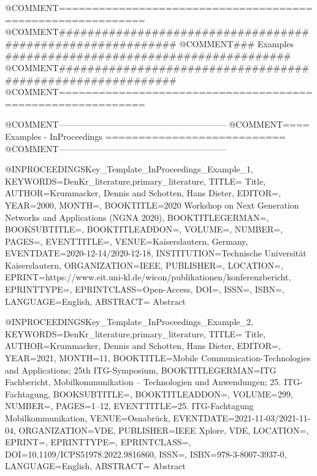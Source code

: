 @COMMENT{===========================================================}
@COMMENT{###########################################################}
@COMMENT{###    Examples    ########################################}
@COMMENT{###########################################################}
@COMMENT{===========================================================}


@COMMENT{-----------------------------------------------------------}
@COMMENT{====  Examples - InProceedings  ===========================}
@COMMENT{-----------------------------------------------------------}

@INPROCEEDINGS{Key_Template_InProceedings_Example_1,
    KEYWORDS={DenKr_literature,primary_literature},
    TITLE={\begingroup
        Title\endgroup},
    AUTHOR={Krummacker, Dennis and Schotten, Hans Dieter},
    EDITOR={},
    YEAR={2000},
    MONTH={},
    BOOKTITLE={2020 Workshop on Next Generation Networks and Applications (NGNA 2020)},
    BOOKTITLEGERMAN={},
    BOOKSUBTITLE={},
    BOOKTITLEADDON={},
    VOLUME={},
    NUMBER={},
    PAGES={},
    EVENTTITLE={},
    VENUE={Kaiserslautern, Germany},
    EVENTDATE={2020-12-14/2020-12-18},
    INSTITUTION={Technische Universit{\"a}t Kaiserslautern},
    ORGANIZATION={IEEE},
    PUBLISHER={},
    LOCATION={},
    EPRINT={https://www.eit.uni-kl.de/wicon/publikationen/konferenzbericht},
    EPRINTTYPE={},
    EPRINTCLASS={Open-Access},
    DOI={},
    ISSN={},
    ISBN={},
    LANGUAGE={English},
    ABSTRACT={\begingroup
        Abstract\endgroup}
}

@INPROCEEDINGS{Key_Template_InProceedings_Example_2,
    KEYWORDS={DenKr_literature,primary_literature},
    TITLE={\begingroup
        Title\endgroup},
    AUTHOR={Krummacker, Dennis and Schotten, Hans Dieter},
    EDITOR={},
    YEAR={2021},
    MONTH={11},
    BOOKTITLE={Mobile Communication-Technologies and Applications; 25th ITG-Symposium},
    BOOKTITLEGERMAN={ITG Fachbericht, Mobilkommunikation -- Technologien und Anwendungen; 25. ITG-Fachtagung},
    BOOKSUBTITLE={},
    BOOKTITLEADDON={},
    VOLUME={299},
    NUMBER={},
    PAGES={1--12},
    EVENTTITLE={25. ITG-Fachtagung Mobilkommunikation},
    VENUE={Osnabr{\"u}ck},
    EVENTDATE={2021-11-03/2021-11-04},
    ORGANIZATION={VDE},
    PUBLISHER={IEEE Xplore, VDE},
    LOCATION={},
    EPRINT={},
    EPRINTTYPE={},
    EPRINTCLASS={},
    DOI={10.1109/ICPS51978.2022.9816860},
    ISSN={},
    ISBN={978-3-8007-3937-0},
    LANGUAGE={English},
    ABSTRACT={\begingroup
        Abstract\endgroup}
}

